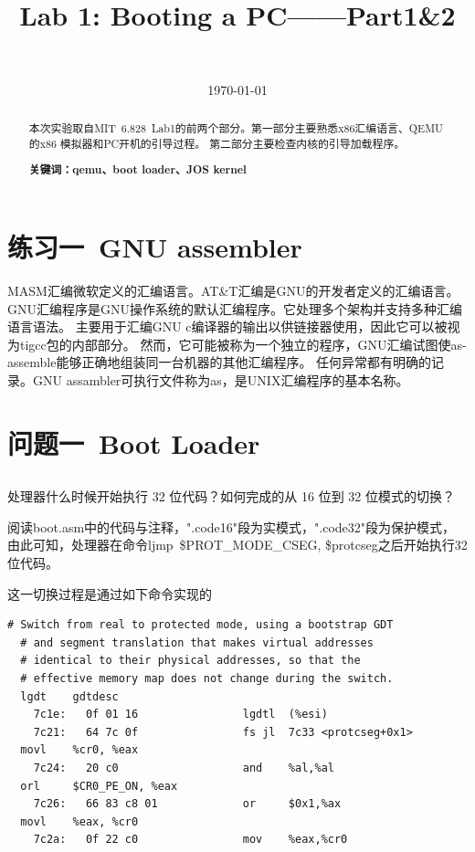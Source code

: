 \documentclass[12pt,a4paper,UTF8]{article}
\begin{document}
\title{Lab 1: Booting a PC——Part1\&2}
\author{\ }
\date{\today}

\maketitle

\begin{abstract}
    \setlength{\parindent}{2em}
    本次实验取自MIT\ 6.828\ Lab1的前两个部分。第一部分主要熟悉x86汇编语言、QEMU的x86 模拟器和PC开机的引导过程。
    第二部分主要检查内核的引导加载程序。

    \textbf{关键词：qemu、boot loader、JOS kernel}
\end{abstract}

\section{练习一\ GNU assembler}

MASM汇编微软定义的汇编语言。AT\&T汇编是GNU的开发者定义的汇编语言。
GNU汇编程序是GNU操作系统的默认汇编程序。它处理多个架构并支持多种汇编语言语法。
主要用于汇编GNU c编译器的输出以供链接器使用，因此它可以被视为tigcc包的内部部分。
然而，它可能被称为一个独立的程序，GNU汇编试图使as-assemble能够正确地组装同一台机器的其他汇编程序。
任何异常都有明确的记录。GNU assambler可执行文件称为as，是UNIX汇编程序的基本名称。


\section{问题一\ Boot Loader}

    \subsection{}
	处理器什么时候开始执行 32 位代码？如何完成的从 16 位到 32 位模式的切换？

	阅读boot.asm中的代码与注释，".code16"段为实模式，".code32"段为保护模式，
	由此可知，处理器在命令ljmp\ \$PROT\_MODE\_CSEG, \$protcseg之后开始执行32位代码。

	这一切换过程是通过如下命令实现的
	\begin{lstlisting}[style=MASM]
  # Switch from real to protected mode, using a bootstrap GDT
  # and segment translation that makes virtual addresses 
  # identical to their physical addresses, so that the 
  # effective memory map does not change during the switch.
  lgdt    gdtdesc
    7c1e:	0f 01 16             	lgdtl  (%esi)
    7c21:	64 7c 0f             	fs jl  7c33 <protcseg+0x1>
  movl    %cr0, %eax
    7c24:	20 c0                	and    %al,%al
  orl     $CR0_PE_ON, %eax
    7c26:	66 83 c8 01          	or     $0x1,%ax
  movl    %eax, %cr0
    7c2a:	0f 22 c0             	mov    %eax,%cr0
	\end{lstlisting}
\end{document}
